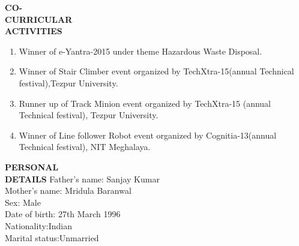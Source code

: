 \documentclass{article}
\begin{document}
  \begin{flushleft} 
  	\vspace{0.4in}
  	\textbf{CO- \\CURRICULAR \\ACTIVITIES }
  	\begin{enumerate}
  		\vspace{-0.65in}
  		\addtolength{\itemindent}{1.359in}
  		\item  Winner of e-Yantra-2015 under theme Hazardous Waste Disposal. 
  		\item  Winner of Stair Climber event organized by TechXtra-15(annual Technical\\\hspace{3.4cm} festival),Tezpur University.
  		\item  Runner up of Track Minion event organized by TechXtra-15 (annual \\\hspace{3.4cm}Technical festival), Tezpur University.  
  		\item  Winner of Line follower Robot event organized by Cognitia-13(annual \\\hspace{3.4cm}Technical festival), NIT Meghalaya.
  		
  	\end{enumerate}
  \end{flushleft}
 
 
 
 \begin{flushleft}
 	\vspace{0.4in}
 	\textbf{PERSONAL \\ DETAILS} 
 	\hspace{0.8in}Father's name: \hspace{0.13in} Sanjay Kumar \\
 	\hspace{1.55in}Mother's name: \hspace{0.08in} Mridula Baranwal\\
 	\hspace{1.55in}Sex:\hspace{0.85in} Male\\
 	\hspace{1.55in}Date of birth:\hspace{0.255in} 27th March 1996	\\
 	\hspace{1.55in}Nationality:\hspace{0.45in}Indian\\
 	\hspace{1.55in}Marital status:\hspace{0.28in}Unmarried
 	
 \end{flushleft}
 
\end{document}
